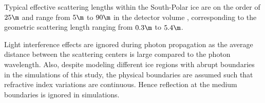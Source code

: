
Typical effective scattering lengths within the South-Polar ice are on the order of $25\m$ \cite{lundberg} and range from $5\m$ to $90\m$ in the detector volume \cite{icepaper}, corresponding to the geometric scattering length ranging from $0.3\m$ to $5.4\m$.

Light interference effects are ignored during photon propagation as the average distance between the scattering centers is large compared to the photon wavelength. \cite{ackermann}
Also, despite modeling different ice regions with abrupt boundaries in the simulations of this study, the physical boundaries are assumed such that refractive index variations are continuous. Hence reflection at the medium boundaries is ignored in simulations. \cite{lundberg}

